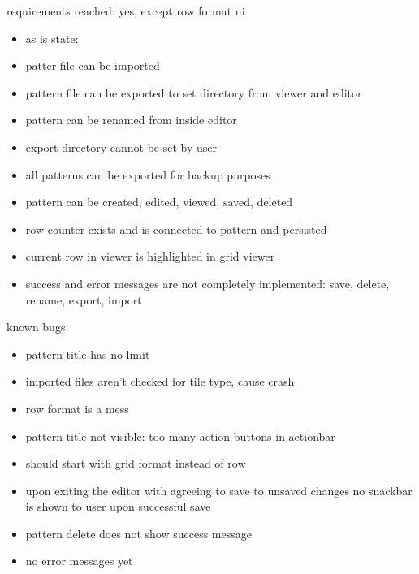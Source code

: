 requirements reached:
yes, except row format ui

\begin{itemize}
\item as is state:
\item patter file can be imported
\item pattern file can be exported to set directory from viewer and editor
\item pattern can be renamed from inside editor
\item export directory cannot be set by user
\item all patterns can be exported for backup purposes
\item pattern can be created, edited, viewed, saved, deleted
\item row counter exists and is connected to pattern and persisted
\item current row in viewer is highlighted in grid viewer
\item success and error messages are not completely implemented: save, delete, rename, export, import
\end{itemize}

known bugs:
\begin{itemize}
\item pattern title has no limit
\item imported files aren't checked for tile type, cause crash
\item row format is a mess
\item pattern title not visible: too many action buttons in actionbar
\item should start with grid format instead of row
\item upon exiting the editor with agreeing to save to unsaved changes no snackbar is shown to user upon successful save
\item pattern delete does not show success message
\item no error messages yet
\end{itemize}


